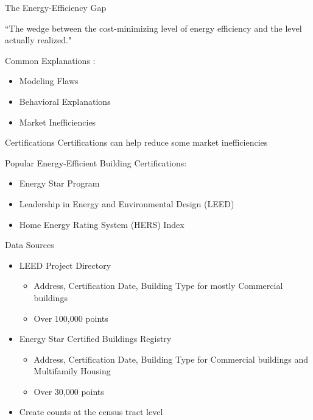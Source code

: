 \documentclass[11pt]{beamer}
\begin{document}


\begin{frame}{The Energy-Efficiency Gap}
\begin{definition}
	``The wedge between the cost-minimizing level of energy efficiency and the level actually realized." \citep{allcott2012there}
\end{definition}

\bigskip
Common Explanations \citep{gerarden2017assessing}:
\begin{itemize}
	\item Modeling Flaws
	\item Behavioral Explanations
	\item Market Inefficiencies
\end{itemize}
\end{frame}


\begin{frame}{Certifications}
Certifications can help reduce some market inefficiencies

\vspace{1.5cm}
Popular Energy-Efficient Building Certifications:
\begin{itemize}
\item Energy Star Program
\item Leadership in Energy and Environmental Design (LEED)
\item Home Energy Rating System (HERS) Index
\end{itemize}
\end{frame}




\begin{frame}{Data Sources}
\begin{itemize}
	\item LEED Project Directory
	\begin{itemize}
		\item Address, Certification Date, Building Type for mostly Commercial buildings
		\item Over 100,000 points
	\end{itemize}
	\vfill
	\item Energy Star Certified Buildings Registry
	\begin{itemize}
		\item Address, Certification Date, Building Type for Commercial buildings and Multifamily Housing
		\item Over 30,000 points
	\end{itemize}
	\vfill
	\item Create counts at the census tract level
\end{itemize}


\end{frame}
\end{document}

